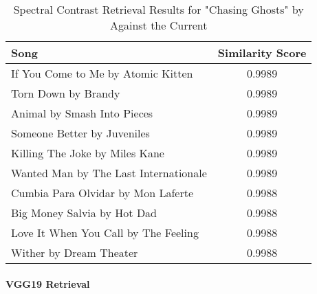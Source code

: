 \documentclass[sigconf]{acmart}
\begin{document}
\begin{table}[ht]
    \centering
    \caption{Spectral Contrast Retrieval Results for "Chasing Ghosts" by Against the Current}
    \label{tab:spectral_chasing_ghosts}
    \begin{tabular}{lc}
        \toprule
        \textbf{Song}                        & \textbf{Similarity Score} \\
        \midrule
        If You Come to Me by Atomic Kitten      & 0.9989                      \\
        Torn Down by Brandy                     & 0.9989                      \\
        Animal by Smash Into Pieces             & 0.9989                      \\
        Someone Better by Juveniles             & 0.9989                      \\
        Killing The Joke by Miles Kane           & 0.9989                      \\
        Wanted Man by The Last Internationale    & 0.9989                      \\
        Cumbia Para Olvidar by Mon Laferte       & 0.9988                      \\
        Big Money Salvia by Hot Dad              & 0.9988                      \\
        Love It When You Call by The Feeling      & 0.9988                      \\
        Wither by Dream Theater                  & 0.9988                      \\
        \bottomrule
    \end{tabular}
\end{table}

\paragraph{VGG19 Retrieval}
\end{document}
